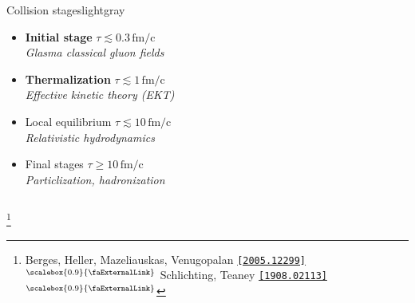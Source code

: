 \documentclass[aspectratio=169,11pt,usenames,dvipsnames]{beamer}
\renewcommand{\thefootnote}{\color{customblue}\faPaperPlaneO}
\newcommand\blfootnote[1]{%
  \begingroup
  \renewcommand\thefootnote{}\footnote{#1}%
  \addtocounter{footnote}{-1}%
  \endgroup
}
\begin{document}
\begin{frame}
\begin{columns}[onlytextwidth,t]
\begin{center}
\begin{custombox2}{\color{normal}Collision stages}{lightgray}
\begin{varwidth}{0.8\textwidth}
\begin{itemize}
                        {\color{lightgray}\scriptsize\itshape {\color{isgold}Color glass condensate (CGC)}}
                    \item {{\bfseries\color{isgold} Initial stage} {\scriptsize $\tau\lesssim
                    0.3\,\mathrm{fm/c}$}}\\[1pt]
                        {\color{lightgray}\scriptsize\itshape {\color{isgold}Glasma classical gluon fields}}
                    \item {\bfseries\color{isgold}Thermalization} {\scriptsize$\tau\lesssim
                    1\,\mathrm{fm/c}$}\\[1pt] 
                        {\color{lightgray}\scriptsize\itshape {\color{isgold}Effective kinetic theory (EKT)}} 
                     \item Local equilibrium {\scriptsize $\tau\lesssim 10\,\mathrm{fm/c}$}\\[1pt]
                    {\color{lightgray}\scriptsize\itshape Relativistic hydrodynamics} 
                    \item Final stages {\scriptsize $\tau\geq 10\,\mathrm{fm/c}$}\\[1pt]
                    {\color{lightgray}\scriptsize\itshape Particlization, hadronization}
                \end{itemize}
                \end{varwidth}
            \end{custombox2}
            \end{center}
    \end{columns}
    \blfootnote{\scriptsize Berges, Heller, Mazeliauskas, Venugopalan \href{https://arxiv.org/abs/2005.12299}{{\color{palgold}\texttt{[2005.12299]$^\text{\scalebox{0.9}{\faExternalLink}}$}}} Schlichting, Teaney \href{https://arxiv.org/abs/1908.02113}{{\color{palgold}\texttt{[1908.02113]$^\text{\scalebox{0.9}{\faExternalLink}}$}}}}

\end{frame}
\end{document}
